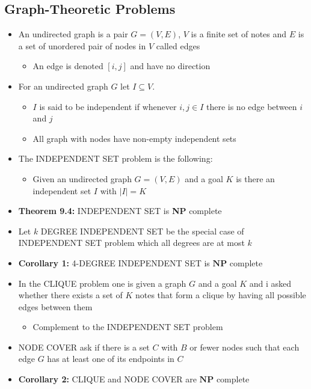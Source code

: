 \documentclass[11pt]{article}
\begin{document}
\subsection{Graph-Theoretic Problems}
\label{sec:org8ddf7df}
\begin{itemize}
\item An undirected graph is a pair \(G= (V,E)\), \(V\) is a finite set of notes and \(E\) is a set of unordered pair of nodes in \(V\) called edges
\begin{itemize}
\item An edge is denoted \([i,j]\) and have no direction
\end{itemize}

\item For an undirected graph \(G\) let \(I \subseteq V\).
\begin{itemize}
\item \(I\) is said to be independent if whenever \(i,j \in I\) there is no edge between \(i\) and \(j\)
\item All graph with nodes have non-empty independent sets
\end{itemize}

\item The INDEPENDENT SET problem is the following:
\begin{itemize}
\item Given an undirected graph \(G=(V,E)\) and a goal \(K\) is there an independent set \(I\) with \(|I| = K\)
\end{itemize}
\item \textbf{Theorem 9.4:} INDEPENDENT SET is \textbf{NP} complete

\item Let \(k\) DEGREE INDEPENDENT SET be the special case of INDEPENDENT SET problem which all degrees are at most \(k\)
\item \textbf{Corollary 1:} 4-DEGREE INDEPENDENT SET is \(\mathbf{NP}\) complete

\item In the CLIQUE problem one is given a graph \(G\) and a goal \(K\) and i asked whether there exists a set of \(K\) notes that form a clique by having all possible edges between them
\begin{itemize}
\item Complement to the INDEPENDENT SET problem
\end{itemize}
\item NODE COVER ask if there is a set \(C\) with \(B\) or fewer nodes such that each edge \(G\) has at least one of its endpoints in \(C\)
\item \textbf{Corollary 2:} CLIQUE and NODE COVER are \(\mathbf{NP}\) complete


\end{itemize}
\end{document}
